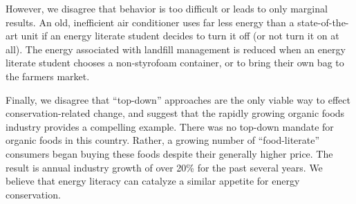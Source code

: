 \documentclass[11pt]{article}
\begin{document}
However, we disagree that behavior is too difficult or leads to only
marginal results.  An old, inefficient air conditioner uses far less energy
than a state-of-the-art unit if an energy literate student decides to turn
it off (or not turn it on at all).  The energy associated with landfill
management is reduced when an energy literate student chooses a
non-styrofoam container, or to bring their own bag to the farmers market.

Finally, we disagree that ``top-down'' approaches are the only viable way
to effect conservation-related change, and suggest that the rapidly growing
organic foods industry provides a compelling example.  There was no
top-down mandate for organic foods in this country. Rather, a growing
number of ``food-literate'' consumers began buying these foods despite
their generally higher price.  The result is annual industry growth of over
20\% for the past several years.  We believe that energy literacy can
catalyze a similar appetite for energy conservation.




\end{document}
